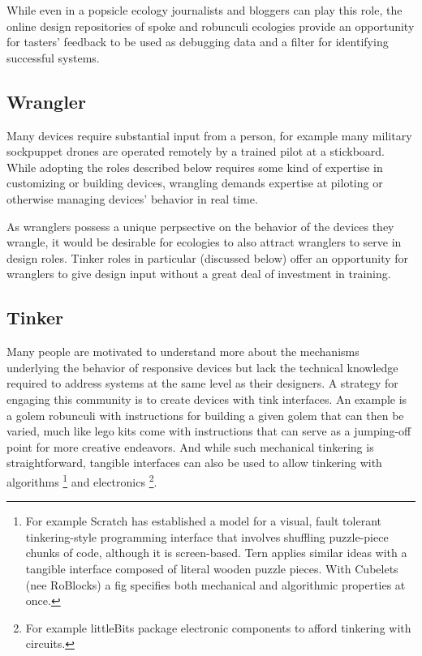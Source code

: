 While even in a popsicle ecology journalists and bloggers can play this role, the online design repositories of spoke and robunculi ecologies provide an opportunity for tasters' feedback to be used as debugging data and a filter for identifying successful systems. 

\subsection{Wrangler}
Many devices require substantial input from a person, for example many military sockpuppet drones are operated remotely by a trained pilot at a stickboard. While adopting the roles described below requires some kind of expertise in customizing or building devices, wrangling demands expertise at piloting or otherwise managing devices' behavior in real time.

As wranglers possess a unique perpsective on the behavior of the devices they wrangle, it would be desirable for ecologies to also attract wranglers to serve in design roles. Tinker roles in particular (discussed below) offer an opportunity for wranglers to give design input without a great deal of investment in training.

\subsection{Tinker}
Many people are motivated to understand more about the mechanisms underlying the behavior of responsive devices but lack the technical knowledge required to address systems at the same level as their designers. 
A strategy for engaging this community is to create devices with tink interfaces. 
An example is a golem robunculi with instructions for building a given golem that can then be varied, much like lego kits come with instructions that can serve as a jumping-off point for more creative endeavors. 
And while such mechanical tinkering is straightforward, tangible interfaces can also be used to allow tinkering with algorithms%
\footnote{For example Scratch \citep{scratch} has established a model for a visual, fault tolerant tinkering-style programming interface that involves shuffling puzzle-piece chunks of code, although it is screen-based. 
Tern \citep{tern_classroom} applies similar ideas with a tangible interface composed of literal wooden puzzle pieces. 
With Cubelets (nee RoBlocks) \citep{roblocks} a fig specifies both mechanical and algorithmic properties at once.} 
and electronics%
\footnote{For example littleBits \citep{littlebits} package electronic components to afford tinkering with circuits.}.

